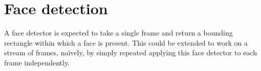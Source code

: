 
\section{Face detection}
A face detector is expected to take a single frame and return a bounding rectangle within which a face is present. This could be extended to work on a stream of frames, naïvely, by simply repeated applying this face detector to each frame independently.

